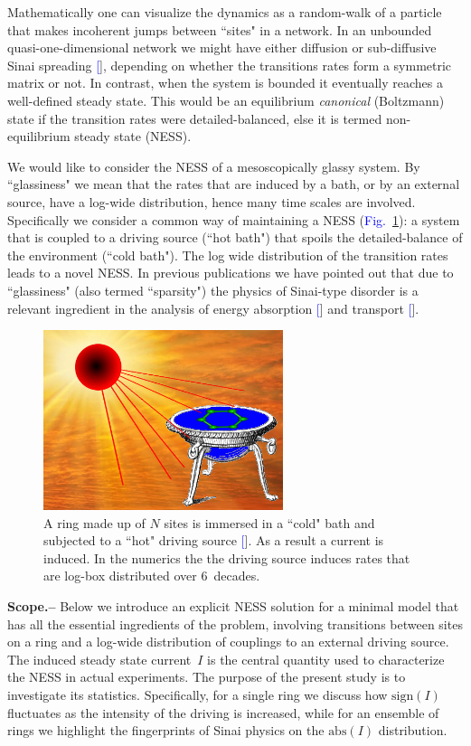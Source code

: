 \documentclass[aps,prl,floats,floatfix,twocolumn]{revtex4}
\newcommand{\sect}[1]{{\bf #1.-- }}
\newcommand{\Fig}[1]{\textcolor{blue}{Fig.}\!\!~\ref{#1}}
\renewcommand{\cite}[1]{\textcolor{blue}{[\onlinecite{#1}}]} %
\begin{document}
Mathematically one can visualize the dynamics as a random-walk 
of a particle that makes incoherent jumps between ``sites" in a network.
In an unbounded quasi-one-dimensional network we might have either diffusion 
or sub-diffusive Sinai spreading \cite{sinai}, depending on whether the transitions rates 
form a symmetric matrix or not. In contrast, when the system is bounded 
it eventually reaches a well-defined steady state. 
This would be an equilibrium {\em canonical} (Boltzmann) state if the transition rates 
were detailed-balanced, else it is termed non-equilibrium steady state (NESS). 

We would like to consider the NESS of a mesoscopically glassy system.
By ``glassiness" we mean that the rates that are induced by a bath, 
or by an external source, have a log-wide distribution, 
hence many time scales are involved. 
Specifically we consider a common way of maintaining a NESS (\Fig{f0}):
a system that is coupled to a driving source (``hot bath") 
that spoils the detailed-balance of the environment (``cold bath"). 
The log wide distribution of the transition rates leads to a novel NESS.
% 
In previous publications we have pointed out that due to ``glassiness" 
(also termed ``sparsity") the physics of Sinai-type disorder is 
a relevant ingredient in the analysis of energy absorption \cite{kbb} 
and transport \cite{ner}.  
   

\begin{figure}
\includegraphics[width=7cm]{SunBath}
\caption{
A ring made up of $N$ sites is immersed in a ``cold" bath 
and subjected to a ``hot" driving source \cite{images}. 
As a result a current is induced.  
%
In the numerics the the driving source induces 
rates that are log-box distributed over 6~decades. 
} 
\label{f0}
\end{figure}



\sect{Scope}
%
% 
Below we introduce an explicit NESS solution for a minimal model that 
has all the essential ingredients of the problem, involving transitions between sites on a ring 
and a log-wide distribution of couplings to an external driving source. 
The induced steady state current~$I$ is the central quantity used to characterize 
the NESS in actual experiments. The purpose of the present study is to investigate 
its statistics. Specifically, for a single ring we discuss how $\text{sign}(I)$ fluctuates    
as the intensity of the driving is increased, while for an ensemble 
of rings we highlight the fingerprints of Sinai physics on the $\text{abs}(I)$ distribution.  
\end{document}
